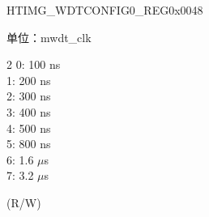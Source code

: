 \begin{register}{H}{TIMG\_WDTCONFIG0\_REG}{0x0048}
\begin{regdesc}
\begin{reglist}
单位：mwdt\_clk
\begin{multicols}{2}
0: 100 ns \\
1: 200 ns \\
2: 300 ns \\
3: 400 ns \\
4: 500 ns \\
5: 800 ns \\
6: 1.6 $\mu$s \\
7: 3.2 $\mu$s \\
\end{multicols}
(R/W)

\item [见下页...]
\end{reglist}\end{regdesc}
\end{register}

